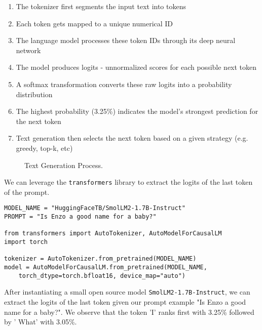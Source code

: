 \begin{enumerate}
    \item The tokenizer first segments the input text into tokens
    \item Each token gets mapped to a unique numerical ID
    \item The language model processes these token IDs through its deep neural network
    \item The model produces logits - unnormalized scores for each possible next token
    \item A softmax  transformation converts these raw logits into a probability distribution
    \item The highest probability (3.25\%) indicates the model's strongest prediction for the next token
    \item Text generation then selects the next token based on a given strategy (e.g. greedy, top-k, etc)
\end{enumerate}



\begin{figure}[h]
\centering

    \caption{Text Generation Process.}
    \label{fig:logit}
\end{figure}

We can leverage the \texttt{transformers} library to extract the logits of the last token of the prompt.



\begin{verbatim}
MODEL_NAME = "HuggingFaceTB/SmolLM2-1.7B-Instruct"
PROMPT = "Is Enzo a good name for a baby?"

from transformers import AutoTokenizer, AutoModelForCausalLM
import torch

tokenizer = AutoTokenizer.from_pretrained(MODEL_NAME)
model = AutoModelForCausalLM.from_pretrained(MODEL_NAME, 
    torch_dtype=torch.bfloat16, device_map="auto")
\end{verbatim}

After instantiating a small open source model \texttt{SmolLM2-1.7B-Instruct}, we can extract the logits of the last token given our prompt example "Is Enzo a good name for a baby?". We observe that the token 'I' ranks first with 3.25\% followed by ' What' with 3.05\%.

